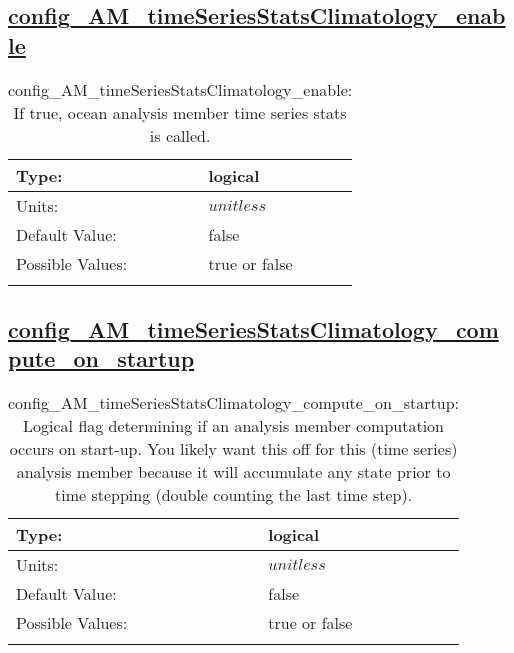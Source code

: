 \subsection[config\_AM\_timeSeriesStatsClimatology\_enable]{\hyperref[sec:nm_tab_AM_timeSeriesStatsClimatology]{config\_AM\_timeSeriesStatsClimatology\_enable}}
\label{subsec:nm_sec_config_AM_timeSeriesStatsClimatology_enable}
\begin{center}
\begin{longtable}{| p{2.0in} || p{4.0in} |}
    \hline
    Type: & logical \\
    \hline
    Units: & $unitless$ \\
    \hline
    Default Value: & false \\
    \hline
    Possible Values: & true or false \\
    \hline
    \caption{config\_AM\_timeSeriesStatsClimatology\_enable: If true, ocean analysis member time series stats is called.}
\end{longtable}
\end{center}
\subsection[config\_AM\_timeSeriesStatsClimatology\_compute\_on\_startup]{\hyperref[sec:nm_tab_AM_timeSeriesStatsClimatology]{config\_AM\_timeSeriesStatsClimatology\_compute\_on\_startup}}
\label{subsec:nm_sec_config_AM_timeSeriesStatsClimatology_compute_on_startup}
\begin{center}
\begin{longtable}{| p{2.0in} || p{4.0in} |}
    \hline
    Type: & logical \\
    \hline
    Units: & $unitless$ \\
    \hline
    Default Value: & false \\
    \hline
    Possible Values: & true or false \\
    \hline
    \caption{config\_AM\_timeSeriesStatsClimatology\_compute\_on\_startup: Logical flag determining if an analysis member computation occurs on start-up. You likely want this off for this (time series) analysis member because it will accumulate any state prior to time stepping (double counting the last time step).}
\end{longtable}
\end{center}

